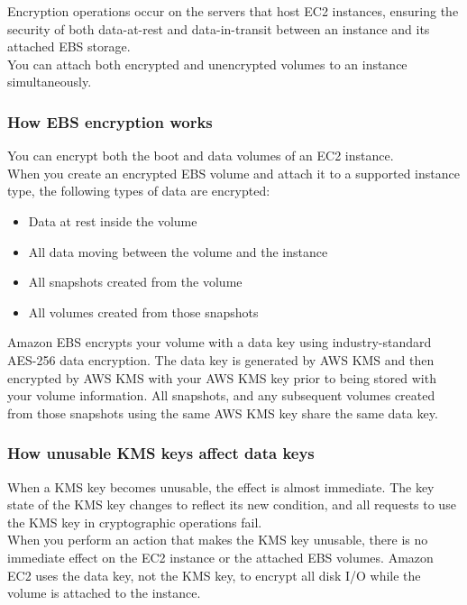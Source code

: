 \documentclass[12pt, letterpaper, twoside]{article}
\begin{document}
Encryption operations occur on the servers that host EC2 instances, ensuring the security of both data-at-rest and data-in-transit between an 
instance and its attached EBS storage.\\

You can attach both encrypted and unencrypted volumes to an instance simultaneously.\\

\subsubsection{How EBS encryption works}
You can encrypt both the boot and data volumes of an EC2 instance.\\
When you create an encrypted EBS volume and attach it to a supported instance type, the following types of data are encrypted:

\begin{itemize}
	\item Data at rest inside the volume

	\item All data moving between the volume and the instance

	\item All snapshots created from the volume

	\item All volumes created from those snapshots
\end{itemize}

Amazon EBS encrypts your volume with a data key using industry-standard AES-256 data encryption. The data key is generated by AWS KMS and 
then encrypted by AWS KMS with your AWS KMS key prior to being stored with your volume information. All snapshots, and any subsequent volumes 
created from those snapshots using the same AWS KMS key share the same data key.\\

\subsubsection{How unusable KMS keys affect data keys}
When a KMS key becomes unusable, the effect is almost immediate. The key state of the KMS key changes to reflect its new condition, and all 
requests to use the KMS key in cryptographic operations fail.\\

When you perform an action that makes the KMS key unusable, there is no immediate effect on the EC2 instance or the attached EBS volumes. 
Amazon EC2 uses the data key, not the KMS key, to encrypt all disk I/O while the volume is attached to the instance.\\
\end{document}
